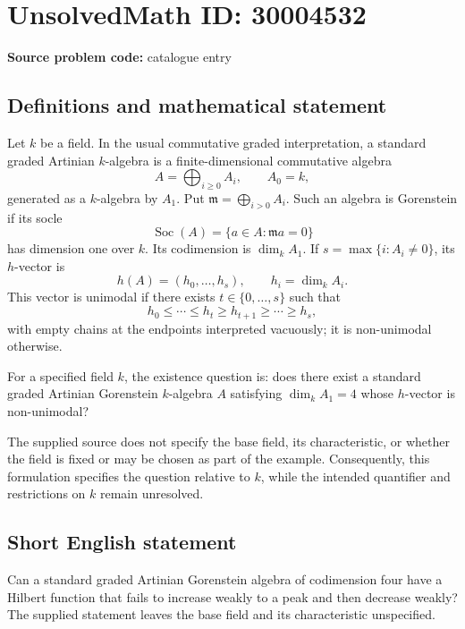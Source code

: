 \documentclass[11pt]{article}
\begin{document}
\section*{UnsolvedMath ID: 30004532}
\textbf{Source problem code:} catalogue entry
\subsection{Definitions and mathematical statement}
Let \(k\) be a field. In the usual commutative graded interpretation, a standard graded Artinian \(k\)-algebra is a finite-dimensional commutative algebra
\[
A=\bigoplus_{i\geq 0}A_i,\qquad A_0=k,
\]
generated as a \(k\)-algebra by \(A_1\). Put \(\mathfrak m=\bigoplus_{i>0}A_i\). Such an algebra is Gorenstein if its socle
\[
\operatorname{Soc}(A)=\{a\in A: \mathfrak m a=0\}
\]
has dimension one over \(k\). Its codimension is \(\dim_k A_1\). If \(s=\max\{i:A_i\neq 0\}\), its \(h\)-vector is
\[
h(A)=(h_0,\ldots,h_s),\qquad h_i=\dim_k A_i.
\]
This vector is unimodal if there exists \(t\in\{0,\ldots,s\}\) such that
\[
h_0\leq\cdots\leq h_t\geq h_{t+1}\geq\cdots\geq h_s,
\]
with empty chains at the endpoints interpreted vacuously; it is non-unimodal otherwise.

For a specified field \(k\), the existence question is: does there exist a standard graded Artinian Gorenstein \(k\)-algebra \(A\) satisfying \(\dim_k A_1=4\) whose \(h\)-vector is non-unimodal?

The supplied source does not specify the base field, its characteristic, or whether the field is fixed or may be chosen as part of the example. Consequently, this formulation specifies the question relative to \(k\), while the intended quantifier and restrictions on \(k\) remain unresolved.
\subsection{Short English statement}
Can a standard graded Artinian Gorenstein algebra of codimension four have a Hilbert function that fails to increase weakly to a peak and then decrease weakly? The supplied statement leaves the base field and its characteristic unspecified.
\end{document}
